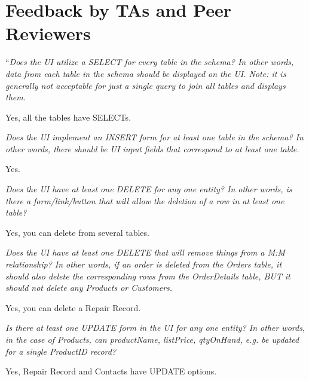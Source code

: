 \documentclass{article}
\begin{document}
\section{Feedback by TAs and Peer Reviewers}
\begin{tcolorbox}[colback=secondarycolor, colframe=primarycolor, title=\textbf{Step 3: Peer Review 1 - Scott Dispensa}]
``\textit{Does the UI utilize a SELECT for every table in the schema? In other words, data from each table in the schema should be displayed on the UI. Note: it is generally not acceptable for just a single query to join all tables and displays them.}

\vspace{0.05cm}
 Yes, all the tables have SELECTs.

\vspace{0.2cm}
\textit{Does the UI implement an INSERT form for at least one table in the schema? In other words, there should be UI input fields that correspond to at least one table.}

\vspace{0.05cm}
 Yes.

\vspace{0.2cm}
\textit{Does the UI have at least one DELETE for any one entity? In other words, is there a form/link/button that will allow the deletion of a row in at least one table?}

\vspace{0.05cm}
Yes, you can delete from several tables.

\vspace{0.2cm}
\textit{Does the UI have at least one DELETE that will remove things from a M:M relationship? In other words, if an order is deleted from the Orders table, it should also delete the corresponding rows from the OrderDetails table, BUT it should not delete any Products or Customers.}

\vspace{0.05cm}
Yes, you can delete a Repair Record.

\vspace{0.2cm}
\textit{Is there at least one UPDATE form in the UI for any one entity? In other words, in the case of Products, can productName, listPrice, qtyOnHand, e.g. be updated for a single ProductID record?}

\vspace{0.05cm}
Yes, Repair Record and Contacts have UPDATE options.


\end{tcolorbox}
\end{document}
